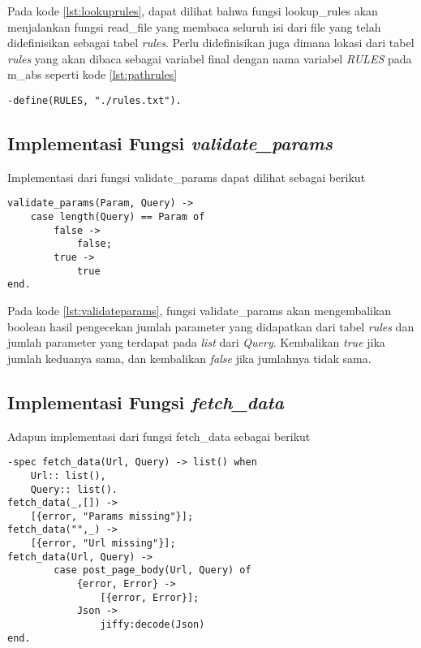 Pada kode \ref{lst:lookuprules}, dapat dilihat bahwa fungsi lookup\_rules akan menjalankan fungsi read\_file yang membaca seluruh isi dari file yang telah didefinisikan sebagai tabel \textit{rules}. Perlu didefinisikan juga dimana lokasi dari tabel \textit{rules} yang akan dibaca sebagai variabel final dengan nama variabel \textit{RULES} pada m\_abs seperti kode \ref{lst:pathrules}
\begin{minipage}{\linewidth}
\begin{lstlisting}[caption={lokasi dari \textit{file} rules.txt},label={lst:pathrules}]
-define(RULES, "./rules.txt").
\end{lstlisting}
\end{minipage}

\subsection{Implementasi Fungsi \textit{validate\_params}}

Implementasi dari fungsi validate\_params dapat dilihat sebagai berikut
\begin{minipage}{\linewidth}
\begin{lstlisting}[caption={Implementasi fungsi validate\_params},label={lst:validateparams}]
validate_params(Param, Query) ->
	case length(Query) == Param of
		false ->
			false;
		true ->
			true
end.
\end{lstlisting}
\end{minipage}

Pada kode \ref{lst:validateparams}, fungsi validate\_params akan mengembalikan boolean hasil pengecekan jumlah parameter yang didapatkan dari tabel \textit{rules} dan jumlah parameter yang terdapat pada \textit{list} dari \textit{Query}. Kembalikan \textit{true} jika jumlah keduanya sama, dan kembalikan \textit{false} jika jumlahnya tidak sama.

\subsection{Implementasi Fungsi \textit{fetch\_data}}

Adapun implementasi dari fungsi fetch\_data sebagai berikut

\begin{minipage}{\linewidth}
\begin{lstlisting}[caption={Implementasi fungsi fetch\_data},label={lst:fetchdata}]
-spec fetch_data(Url, Query) -> list() when
	Url:: list(),
    Query:: list().
fetch_data(_,[]) ->
    [{error, "Params missing"}];
fetch_data("",_) ->
	[{error, "Url missing"}];
fetch_data(Url, Query) ->
	    case post_page_body(Url, Query) of
	        {error, Error} ->
	            [{error, Error}];
	        Json ->     
	            jiffy:decode(Json)
end.
\end{lstlisting}
\end{minipage}

